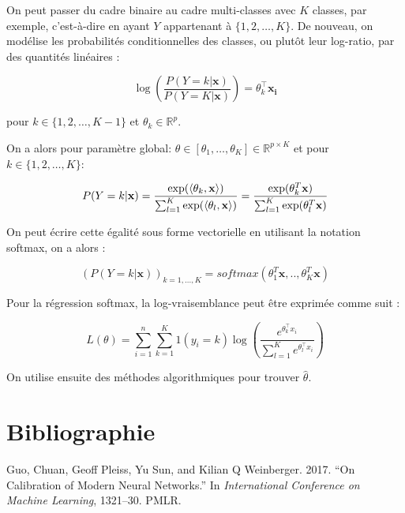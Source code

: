 \documentclass[
  letterpaper,
  DIV=11,
  numbers=noendperiod]{scrartcl}
\newlength{\cslhangindent}
\newlength{\cslentryspacingunit} %
\newenvironment{CSLReferences}[2] %
 {%
  \setlength{\parindent}{0pt}
  \ifodd #1
  \let\oldpar\par
  \def\par{\hangindent=\cslhangindent\oldpar}
  \fi
  \setlength{\parskip}{#2\cslentryspacingunit}
 }%
 {}
\begin{document}
On peut passer du cadre binaire au cadre multi-classes avec \(K\)
classes, par exemple, c'est-à-dire en ayant \(Y\) appartenant à
\(\{1, 2, \ldots, K\}\). De nouveau, on modélise les probabilités
conditionnelles des classes, ou plutôt leur log-ratio, par des quantités
linéaires :

\[
\log\left(\frac{P(Y=k|\mathbf{x})}{P(Y=K|\mathbf{x})}\right) = \theta_k^\top \mathbf{x_i}
\]

pour \(k \in \{1, 2, \ldots, K-1\}\) et \(\theta_{k} \in \mathbb{R}^p\).

On a alors pour paramètre global:
\(\theta \in [\theta_1, \ldots, \theta_K] \in \mathbb{R}^{p\times K}\)
et pour \(k \in \{1, 2, \ldots, K\}\):

\[
P(Y=k | \mathbf{x}) = \frac{\exp(\langle {\theta}_k, \mathbf{x} \rangle)}{\sum_{l=1}^{K} \exp(\langle {\theta}_l, \mathbf{x} \rangle)} \\
= \frac{\exp({\theta}_k^T \mathbf{x})}{\sum_{l=1}^{K} \exp({\theta}_l^T \mathbf{x})}
\]

On peut écrire cette égalité sous forme vectorielle en utilisant la
notation softmax, on a alors :

\[
(P(Y=k | \mathbf{x}))_{k=1,...,K}=softmax(\theta_1^T\mathbf{x},..,\theta_K^T\mathbf{x})
\]

Pour la régression softmax, la log-vraisemblance peut être exprimée
comme suit :

\[
L({\theta}) = \sum_{i=1}^{n} \sum_{k=1}^{K} {1}(y_i = k) \log\left(\frac{e^{\theta_k^\top x_i}}{\sum_{l=1}^{K} e^{\theta_l^\top x_i}}\right)
\]

On utilise ensuite des méthodes algorithmiques pour trouver
\({\hat{\theta}}\).

\hypertarget{bibliographie}{%
\section{Bibliographie}\label{bibliographie}}

\hypertarget{refs}{}
\begin{CSLReferences}{1}{0}
\leavevmode{}%
Guo, Chuan, Geoff Pleiss, Yu Sun, and Kilian Q Weinberger. 2017. {``On
Calibration of Modern Neural Networks.''} In \emph{International
Conference on Machine Learning}, 1321--30. PMLR.

\end{CSLReferences}
\end{document}
